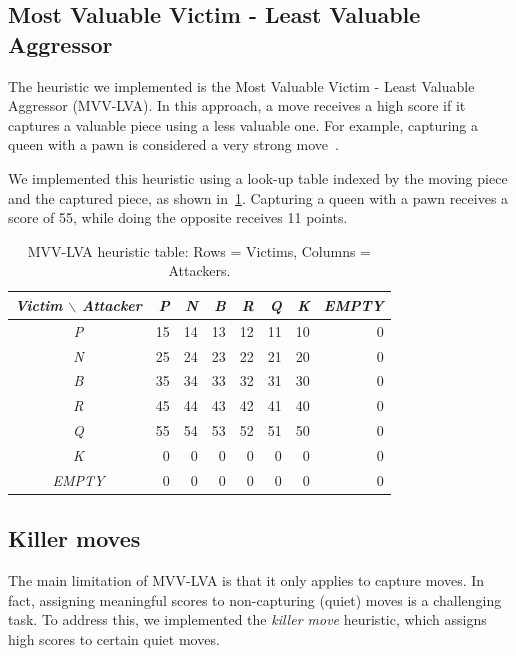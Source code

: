 \subsection{Most Valuable Victim - Least Valuable Aggressor}

The heuristic we implemented is the Most Valuable Victim - Least Valuable Aggressor (MVV-LVA). In this approach, a move receives a high score if it captures a valuable piece using a less valuable one. For example, capturing a queen with a pawn is considered a very strong move~\cite{MVVLVA}.

\vspace{1em}

\noindent We implemented this heuristic using a look-up table indexed by the moving piece and the captured piece, as shown in~\cref{tab:mvv-lva-table}. Capturing a queen with a pawn receives a score of 55, while doing the opposite receives 11 points.

\begin{table}
    \centering
    \begin{tabular}{|c|r|r|r|r|r|r|r|}
    \hline
    \textit{Victim $\backslash$ Attacker} & \textit{P} & \textit{N} & \textit{B} & \textit{R} & \textit{Q} & \textit{K} & \textit{EMPTY} \\
    \hline
    \textit{P}     & 15 & 14 & 13 & 12 & 11 & 10 & 0 \\
    \textit{N}     & 25 & 24 & 23 & 22 & 21 & 20 & 0 \\
    \textit{B}     & 35 & 34 & 33 & 32 & 31 & 30 & 0 \\
    \textit{R}     & 45 & 44 & 43 & 42 & 41 & 40 & 0 \\
    \textit{Q}     & 55 & 54 & 53 & 52 & 51 & 50 & 0 \\
    \textit{K}     &  0 &  0 &  0 &  0 &  0 &  0 & 0 \\
    \textit{EMPTY} &  0 &  0 &  0 &  0 &  0 &  0 & 0 \\
    \hline
    \end{tabular}
    \caption{MVV-LVA heuristic table: Rows = Victims, Columns = Attackers.}\label{tab:mvv-lva-table}
\end{table}

\subsection{Killer moves}

The main limitation of MVV-LVA is that it only applies to capture moves. In fact, assigning meaningful scores to non-capturing (quiet) moves is a challenging task. To address this, we implemented the \textit{killer move} heuristic, which assigns high scores to certain quiet moves.

